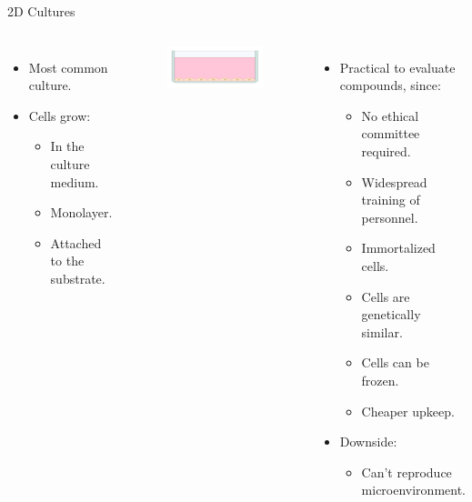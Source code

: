 \begin{frame}{2D Cultures}
    \begin{columns}
        \begin{itemize}
            \item<1-> Most common culture.
            \item<2-> Cells grow:
            \begin{itemize}
                \item<3-> In the culture medium.
                \item<4-> Monolayer.
                \item<5-> Attached to the substrate.
            \end{itemize}
        \end{itemize}

        \begin{figure}[!htb]
            \centering
            \includegraphics[width=6cm]{figures/introduction/2D_culture}
        \end{figure}

        \begin{itemize}
            \item<6-> Practical to evaluate compounds, since:
            \begin{itemize}
                \item<7-> No ethical committee required.
                \item<8-> Widespread training of personnel.
                \item<9-> Immortalized cells.
                \item<10-> Cells are genetically similar.
                \item<11-> Cells can be frozen.
                \item<12-> Cheaper upkeep.
            \end{itemize}
            \item<13-> Downside:
                \begin{itemize}
                    \item<14-> Can't reproduce microenvironment.
                \end{itemize}
        \end{itemize}
    \end{columns}
\end{frame}


